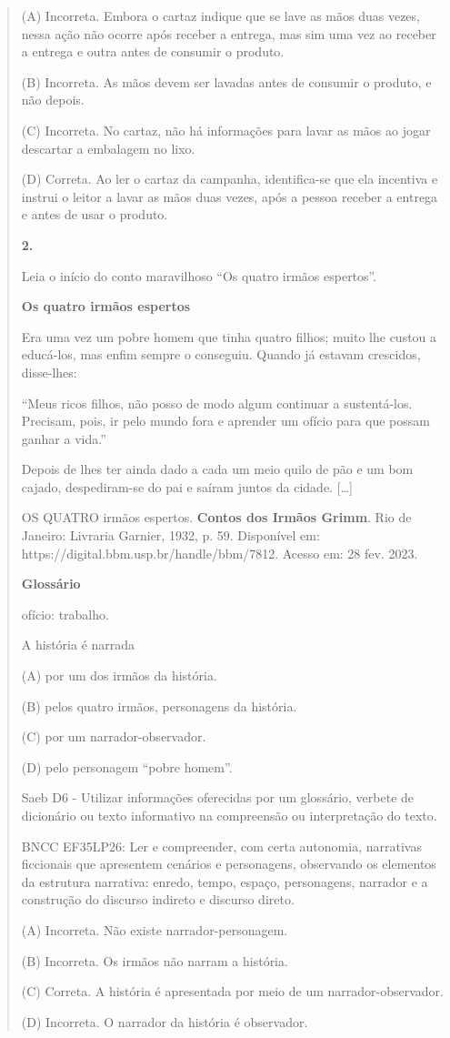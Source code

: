 \begin{quote}
(A) Incorreta. Embora o cartaz indique que se lave as mãos duas vezes,
nessa ação não ocorre após receber a entrega, mas sim uma vez ao receber
a entrega e outra antes de consumir o produto.

(B) Incorreta. As mãos devem ser lavadas antes de consumir o produto, e
não depois.

(C) Incorreta. No cartaz, não há informações para lavar as mãos ao jogar
descartar a embalagem no lixo.

(D) Correta. Ao ler o cartaz da campanha, identifica-se que ela
incentiva e instrui o leitor a lavar as mãos duas vezes, após a pessoa
receber a entrega e antes de usar o produto.

\textbf{2.}

Leia o início do conto maravilhoso ``Os quatro irmãos espertos''.

\textbf{Os quatro irmãos espertos}

Era uma vez um pobre homem que tinha quatro filhos; muito lhe custou a
educá-los, mas enfim sempre o conseguiu. Quando já estavam crescidos,
disse-lhes:

``Meus ricos filhos, não posso de modo algum continuar a sustentá-los.
Precisam, pois, ir pelo mundo fora e aprender um ofício para que possam
ganhar a vida.''

Depois de lhes ter ainda dado a cada um meio quilo de pão e um bom
cajado, despediram-se do pai e saíram juntos da cidade. {[}\ldots{}{]}

OS QUATRO irmãos espertos. \textbf{Contos dos Irmãos Grimm}. Rio de
Janeiro: Livraria Garnier, 1932, p. 59. Disponível em:
https://digital.bbm.usp.br/handle/bbm/7812. Acesso em: 28 fev. 2023.

\textbf{Glossário}

ofício: trabalho.

A história é narrada

(A) por um dos irmãos da história.

(B) pelos quatro irmãos, personagens da história.

(C) por um narrador-observador.

(D) pelo personagem ``pobre homem''.

Saeb D6 - Utilizar informações oferecidas por um glossário, verbete de
dicionário ou texto informativo na compreensão ou interpretação do
texto.

BNCC EF35LP26: Ler e compreender, com certa autonomia, narrativas
ficcionais que apresentem cenários e personagens, observando os
elementos da estrutura narrativa: enredo, tempo, espaço, personagens,
narrador e a construção do discurso indireto e discurso direto.

(A) Incorreta. Não existe narrador-personagem.

(B) Incorreta. Os irmãos não narram a história.

(C) Correta. A história é apresentada por meio de um
narrador-observador.

(D) Incorreta. O narrador da história é observador.
\end{quote}

